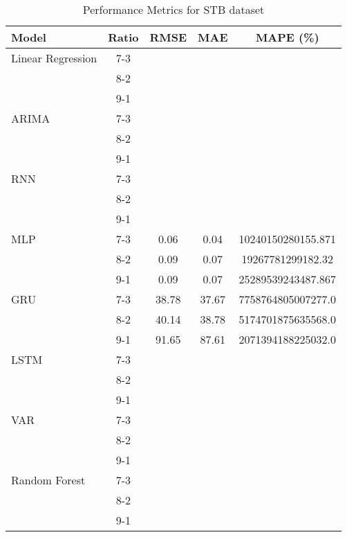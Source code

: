 \begin{table}[h!]
    \centering
    \caption{Performance Metrics for STB dataset}
    \begin{tabular}{|l|c|c|c|c|}
    \hline
    \rowcolor{orange!30} \textbf{Model} & \textbf{Ratio} & \textbf{RMSE} & \textbf{MAE} & \textbf{MAPE (\%)} \\ \hline
    \rowcolor{white} Linear Regression & 7-3 &  &  &  \\ \hline
    \rowcolor{white}  & 8-2 &  &  &  \\ \hline
    \rowcolor{white}  & 9-1 &  &  &  \\ \hline
    \rowcolor{green!30} ARIMA & 7-3 &  &  &  \\ \hline
    \rowcolor{green!30}  & 8-2 &  &  &  \\ \hline
    \rowcolor{green!30}  & 9-1 &  &  &  \\ \hline
    \rowcolor{white} RNN & 7-3 &  &  &  \\ \hline
    \rowcolor{white}  & 8-2 &  &  &  \\ \hline
    \rowcolor{white}  & 9-1 &  &  &  \\ \hline
    \rowcolor{white} MLP & 7-3 & 0.06 & 0.04& 10240150280155.871 \\ \hline
    \rowcolor{white}  & 8-2 & 0.09 & 0.07 & 19267781299182.32 \\ \hline
    \rowcolor{white}  & 9-1 & 0.09 & 0.07& 25289539243487.867  \\ \hline
    \rowcolor{white} GRU & 7-3 & 38.78 & 37.67 & 7758764805007277.0 \\ \hline
    \rowcolor{white}  & 8-2 & 40.14 & 38.78 & 5174701875635568.0 \\ \hline
    \rowcolor{white}  & 9-1 & 91.65 & 87.61 & 2071394188225032.0 \\ \hline
    \rowcolor{white} LSTM & 7-3 &  &  &  \\ \hline
    \rowcolor{white}  & 8-2 &  &  &  \\ \hline
    \rowcolor{white}  & 9-1 &  &  &  \\ \hline
    \rowcolor{green!30} VAR & 7-3 &  &  &  \\ \hline
    \rowcolor{green!30}  & 8-2 &  &  &  \\ \hline
    \rowcolor{green!30}  & 9-1 &  &  &  \\ \hline
    \rowcolor{white} Random Forest & 7-3 &  &  &  \\ \hline
    \rowcolor{white}  & 8-2 &  &  &  \\ \hline
    \rowcolor{white}  & 9-1 &  &  &  \\ \hline

\end{tabular}
\end{table}
